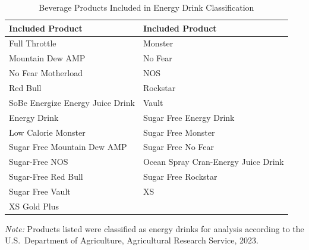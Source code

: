 \begin{table}[htbp]
\centering
\caption{Beverage Products Included in Energy Drink Classification}
\label{tab:products}
\begin{tabular}{ll}
\toprule
\textbf{Included Product} & \textbf{Included Product} \\
\midrule
Full Throttle             & Monster \\
Mountain Dew AMP          & No Fear \\
No Fear Motherload        & NOS \\
Red Bull                  & Rockstar \\
SoBe Energize Energy Juice Drink & Vault \\
Energy Drink              & Sugar Free Energy Drink \\
Low Calorie Monster       & Sugar Free Monster \\
Sugar Free Mountain Dew AMP & Sugar Free No Fear \\
Sugar-Free NOS            & Ocean Spray Cran-Energy Juice Drink \\
Sugar-Free Red Bull       & Sugar Free Rockstar \\
Sugar Free Vault          & XS \\
XS Gold Plus              & \\
\bottomrule
\end{tabular}

\smallskip
\footnotesize\textit{Note:} Products listed were classified as energy drinks for analysis according to the U.S.\ Department of Agriculture, Agricultural Research Service, 2023.
\end{table}
